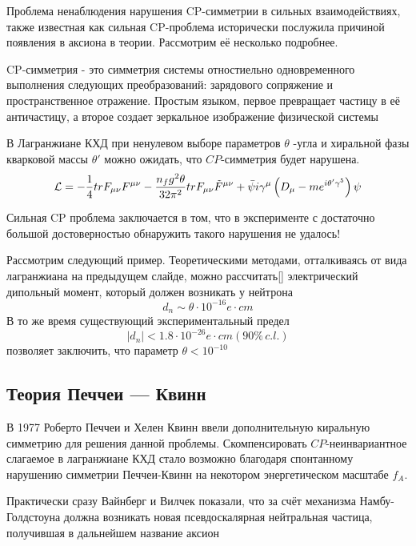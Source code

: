 \documentclass[a4paper,article,14pt]{extarticle}
\begin{document}
Проблема ненаблюдения нарушения CP-симметрии в сильных взаимодействиях, также известная как сильная CP-проблема исторически послужила причиной появления в аксиона в теории. Рассмотрим её несколько подробнее.

CP-симметрия - это симметрия системы отностиельно одновременного выполнения следующих преобразований: зарядового сопряжение и пространственное отражение. Простым языком, первое превращает частицу в её античастицу, а второе создает зеркальное изображение физической системы

В Лагранжиане КХД при ненулевом выборе параметров $\theta$ -угла и хиральной фазы кварковой массы $\theta'$ можно ожидать, что $CP$-симметрия будет нарушена.
\begin{equation}
 {\cal L}  =  - \frac{1}{4}tr{F_{\mu \nu }}{F^{\mu \nu }} - \frac{{{n_f}{g^2}\theta }}{{32{\pi ^2}}}tr{F_{\mu \nu }}{\tilde F^{\mu \nu }} +\bar \psi i{\gamma ^\mu }\left( {{D_\mu } - m{e^{i\theta '{\gamma ^5}}}} \right)\psi 
\label{eq:lagrangian}
\end{equation}
 
Сильная CP проблема заключается в том, что в эксперименте с достаточно большой достоверностью обнаружить такого нарушения не удалось!

Рассмотрим следующий пример. Теоретическими методами, отталкиваясь от вида лагранжиана на предыдущем слайде, можно рассчитать[] электрический дипольный момент, который должен возникать у нейтрона
\begin{equation}
    {d_n} \sim \theta  \cdot {10^{ - 16}}e \cdot cm
\end{equation}
В то же время существующий экспериментальный предел
\begin{equation}
    \left| {{d_n}} \right| < 1.8 \cdot {10^{ - 26}}e \cdot cm\left( {90\% \,c.l.} \right)
\end{equation}
позволяет заключить, что параметр $\theta  < {10^{ - 10}}$


\subsection{Теория Печчеи — Квинн}

В 1977 Роберто Печчеи и Хелен Квинн ввели дополнительную киральную симметрию для решения данной проблемы. Скомпенсировать $CP$-неинвариантное слагаемое в лагранжиане КХД стало возможно благодаря спонтанному нарушению симметрии Печчеи-Квинн на некотором энергетическом масштабе  $f_A$.

Практически сразу Вайнберг и Вилчек показали, что за счёт механизма Намбу-Голдстоуна должна возникать новая псевдоскалярная нейтральная частица, получившая в дальнейшем название аксион
\end{document}

